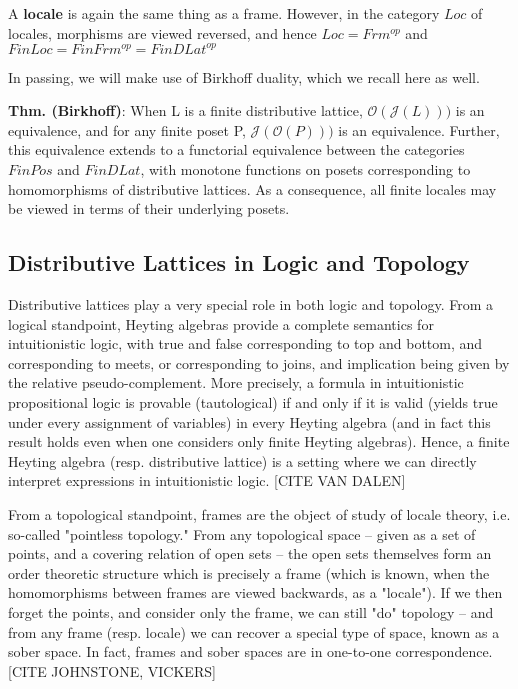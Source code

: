 \documentclass[hoptionsi,review,format=acmsmall]{acmart}
\theoremstyle{definition}
\newcommand{\Oc}{\mathcal{O}}
\newcommand{\Jc}{\mathcal{J}}
\begin{document}
A \textbf{locale} is again the same thing as a frame. However, in the category \(Loc\) of locales, morphisms are viewed reversed, and hence \(Loc = Frm^{op}\) and \(FinLoc = FinFrm^{op} = FinDLat^{op}\)

In passing, we will make use of Birkhoff duality, which we recall here as well.

\textbf{Thm. (Birkhoff)}: When L is a finite distributive lattice, \(\Oc(\Jc(L)))\) is an equivalence, and for any finite poset P,  \(\Jc(\Oc(P)))\) is an equivalence. Further, this equivalence extends to a functorial equivalence between the categories \(FinPos\) and \(FinDLat\), with monotone functions on posets corresponding to homomorphisms of distributive lattices. As a consequence, all finite locales may be viewed in terms of their underlying posets.

\subsection{Distributive Lattices in Logic and Topology}

Distributive lattices play a very special role in both logic and topology. From a logical standpoint, Heyting algebras provide a complete semantics for intuitionistic logic, with true and false corresponding to top and bottom, and corresponding to meets, or corresponding to joins, and implication being given by the relative pseudo-complement. More precisely, a formula in intuitionistic propositional logic is provable (tautological) if and only if it is valid (yields true under every assignment of variables) in every Heyting algebra (and in fact this result holds even when one considers only finite Heyting algebras). Hence, a finite Heyting algebra (resp. distributive lattice) is a setting where we can directly interpret expressions in intuitionistic logic. [CITE VAN DALEN]

From a topological standpoint, frames are the object of study of locale theory, i.e. so-called "pointless topology." From any topological space -- given as a set of points, and a covering relation of open sets -- the open sets themselves form an order theoretic structure which is precisely a frame (which is known, when the homomorphisms between frames are viewed backwards, as a "locale"). If we then forget the points, and consider only the frame, we can still "do" topology -- and from any frame (resp. locale) we can recover a special type of space, known as a sober space. In fact, frames and sober spaces are in one-to-one correspondence. [CITE JOHNSTONE, VICKERS]
\end{document}
